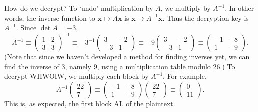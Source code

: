 \documentclass{article}
\theoremstyle{plain}
\theoremstyle{definition}
\theoremstyle{remark}
\numberwithin{theorem}{section}
\begin{document}
How do we decrypt?  To `undo' multiplication by $A$, we multiply by $A^{-1}$.  In other words, the inverse function to $\mathbf{x} \mapsto A\mathbf{x}$ is $\mathbf{x} \mapsto A^{-1} \mathbf{x}$.  Thus the decryption key is $A^{-1}$.  Since $\det A = -3$, 
\[
A^{-1} \equiv \begin{pmatrix} 1 & 2 \\ 3 & 3 \end{pmatrix}^{-1} \equiv  -3^{-1} \begin{pmatrix} 3 & -2 \\ -3 & 1 \end{pmatrix} \equiv -9
\begin{pmatrix} 3 & -2 \\ -3 & 1 \end{pmatrix}
\equiv \begin{pmatrix} -1 & -8 \\ 1 & -9 \end{pmatrix}.
\]
(Note that since we haven't developed a method for finding inverses yet, we can find the inverse of $3$, namely $9$, using a multiplication table modulo $26$.)
To decrypt WHWOIW, we multiply each block by $A^{-1}$.  For example,
\[
A^{-1} \begin{pmatrix} 22 \\ 7  \end{pmatrix}
\equiv
\begin{pmatrix} -1 & -8 \\ 1 & -9 \end{pmatrix}
\begin{pmatrix} 22 \\ 7  \end{pmatrix}
\equiv
\begin{pmatrix} 0 \\ 11  \end{pmatrix}.
\]
This is, as expected, the first block AL of the plaintext.
\end{document}
